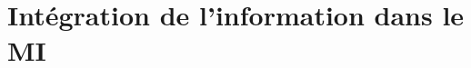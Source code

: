 
\clearpage\newpage
\section{Intégration de l'information dans le MI}
\label{integrationinformationmasquageinformationnel}

